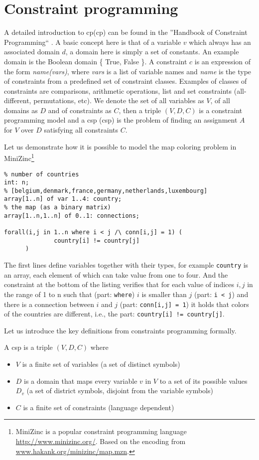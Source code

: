 \section{Constraint programming}
A detailed introduction to \acrlong{cp}(\acrshort{cp}) can be found in the ''Handbook of Constraint Programming`` \parencite{handbookcp}. A basic concept here is that of a variable $v$ which always has an associated domain $d$, a domain here is simply a set of constants. An example domain is the Boolean domain \{ True, False \}. A constraint $c$ is an expression of the form \textit{name(vars)}, where \textit{vars} is a list of variable names and \textit{name} is the type of constraints from a predefined set of constraint classes. Examples of classes of constraints are comparisons,   arithmetic operations, list and set constraints (all-different, permutations, etc). We denote the set of all variables as $V$, of all domains as $D$ and of constraints as $C$, then a triple $(V,D,C)$ is a constraint programming model and a \acrlong{csp} (\acrshort{csp}) is the problem of finding an assignment $A$ for $V$ over $D$ satisfying all constraints $C$.

Let us demonstrate how it is possible to model the map coloring problem in MiniZinc\footnote{MiniZinc is a popular constraint programming language \url{http://www.minizinc.org/}. Based on the encoding from \url{www.hakank.org/minizinc/map.mzn}.}  
\begin{lstlisting}
% number of countries
int: n; 
% [belgium,denmark,france,germany,netherlands,luxembourg]
array[1..n] of var 1..4: country; 
% the map (as a binary matrix)
array[1..n,1..n] of 0..1: connections; 

forall(i,j in 1..n where i < j /\ conn[i,j] = 1) (
              country[i] != country[j]
      )
\end{lstlisting}
The first lines define variables together with their types, for example \texttt{country} is an array, each element of which can take value from one to four. And the constraint at the bottom of the listing verifies that for each value of indices $i,j$ in the range of 1 to n such that (part: \texttt{where}) $i$ is smaller than $j$ (part: \texttt{i < j}) and there is a connection between $i$ and $j$ (part: \texttt{conn[i,j] = 1}) it holds that colors of the countries are different, i.e., the part: \texttt{country[i] != country[j]}.

Let us introduce the key definitions from constraints programming formally.
\begin{definition}
    A \acrshort{csp} is a triple $(V,D,C)$ where
    \begin{itemize}
        \item $V$ is a finite set of variables (a set of distinct symbols)
        \item $D$ is a domain that maps every variable $v$ in $V$ to a set of its possible values $D_v$ (a set of district symbols, disjoint from the variable symbols)
        \item $C$ is a finite set of constraints (language dependent)
    \end{itemize}
\end{definition}

